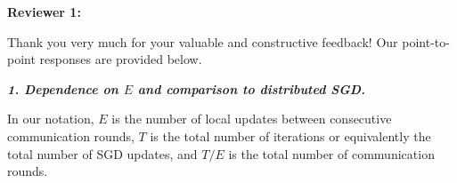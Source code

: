 \documentclass{article}
\begin{document}

% 
{\color{blue}\textbf{Reviewer 1:}} 

Thank you very much for your valuable and constructive feedback! Our point-to-point responses are provided below.

\textbf{\textit{1. Dependence on $E$ and comparison to distributed SGD.}} 
\begin{comment}
To clarify, $E$ is the number of local updates between consecutive communication rounds, and $T/E$ is the total number of communication rounds. Convergence speed is faster when the latter increases, but decreases when $E$ increases.
This is because due to the heterogeneity in data at local sources, when the number of local SGD updates $E$ increases, the parameter at each local client drifts further towards the optimizer of the local optimization problem rather than the global problem, and so the convergence of FedAvg is expected to degrade with increased $E$. However, this does not mean that we should always do model averaging at every iteration, as distributed SGD does, because communication can be costly, and this was one of the original motivations for Federated Learning. So increasing $E$ does not improve the convergence speed in terms of number of total updates, but decreases the number of communications required to achieve a rate (which can translate to faster wall clock time when communication is costly). For example, our results imply that the number of communication rounds $T/E$ can be as small as $\mathcal{O}(\sqrt{NT})$ in the full participation case without degrading the $\mathcal{O}(1/NT)$ linear speedup rate, whereas distributed SGD needs $T$ communications (since it averages at every iteration) to achieve the same $\mathcal{O}(1/NT)$ convergence rate. See the discussion under communication complexity on page 6. We apologize if this point was not made clear in the text, and can clarify it further in the main text if the reviewer thinks that it is necessary.
\end{comment}

In our notation, $E$ is the number of local updates between consecutive communication rounds, $T$ is the total number of iterations or equivalently the total number of SGD updates, and
$T/E$ is the total number of communication rounds. 
\end{document}
